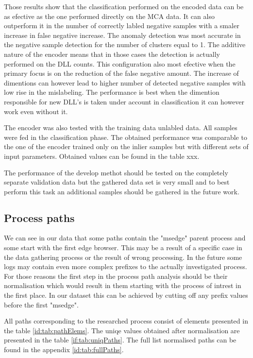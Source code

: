 \documentclass[a4paper,twoside,12pt]{book}
\begin{document}
Those results show that the classification performed on the encoded data can be as efective
as the one performed directly on the MCA data. It can also outperform it in the number of 
correctly labled negative samples with a smaler increase in false negative increase. The anomaly 
detection was most accurate in the negative sample detection for the number of clusters equal to 1.
The additive nature of the encoder means that in those cases the detection is actually performed 
on the DLL counts. This configuration also most efective when the primary focus is on the reduction
of the false negative amount. The increase of dimentions can however lead to higher number of detected
negative samples with low rise in the mislabeling. The performance is best when the dimention 
responsible for new DLL's is taken under account in classification it can however work even 
without it. 

The encoder was also tested with the training data unlabled data. All samples were fed in the 
classification phase. The obtained performance was comparable to the one of the encoder trained 
only on the inlier samples but with different sets of input parameters. Obtained values can be found
in the table xxx.

The performance of the develop methot should be tested on the completely separate validation data but 
the gathered data set is very small and to best perform this task an additional samples should 
be gathered in the future work.

\subsection{Process paths}

We can see in our data that some paths contain the "msedge" parent process and some start with the first 
edge browser. This may be a result of a specific case in the data gathering process or the result of wrong 
processing. In the future some logs may contain even more complex prefixes to the actually investigated
process. For those reasons the first step in the process path analysis should be their normalisation which
would result in them starting with the process of intrest in the first place. In our dataset this can 
be achieved by cutting off any prefix values before the first "msedge".  

All paths corresponding to the researched process consist of elements presented in the table 
\ref{id:tab:pathElems}. The uniqe values obtained after normalisation are presented in the table 
\ref{if:tab:uniqPaths}. The full list normalised paths can be found in the appendix \ref{id:tab:fullPaths}.
\end{document}
